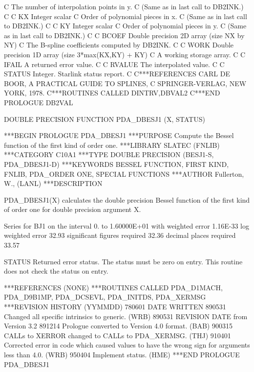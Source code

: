 \documentclass[11pt,twoside,nolof]{starlink}
\begin{document}
\begin{terminalv}
C           The number of interpolation points in y.
C           (Same as in last call to DB2INK.)
C
C   KX      Integer scalar
C           Order of polynomial pieces in x.
C           (Same as in last call to DB2INK.)
C
C   KY      Integer scalar
C           Order of polynomial pieces in y.
C           (Same as in last call to DB2INK.)
C
C   BCOEF   Double precision 2D array (size NX by NY)
C           The B-spline coefficients computed by DB2INK.
C
C   WORK    Double precision 1D array (size 3*max(KX,KY) + KY)
C           A working storage array.
C
C   IFAIL   A returned error value.
C
C   RVALUE  The interpolated value.
C
C   STATUS  Integer. Starlink status report.
C
C***REFERENCES  CARL DE BOOR, A PRACTICAL GUIDE TO SPLINES,
C                 SPRINGER-VERLAG, NEW YORK, 1978.
C***ROUTINES CALLED  DINTRV,DBVAL2
C***END PROLOGUE  DB2VAL
\end{terminalv}



\begin{terminalv}
      DOUBLE PRECISION FUNCTION PDA_DBESJ1 (X, STATUS)


***BEGIN PROLOGUE  PDA_DBESJ1
***PURPOSE  Compute the Bessel function of the first kind of order one.
***LIBRARY   SLATEC (FNLIB)
***CATEGORY  C10A1
***TYPE      DOUBLE PRECISION (BESJ1-S, PDA_DBESJ1-D)
***KEYWORDS  BESSEL FUNCTION, FIRST KIND, FNLIB, PDA_ORDER ONE,
             SPECIAL FUNCTIONS
***AUTHOR  Fullerton, W., (LANL)
***DESCRIPTION

 PDA_DBESJ1(X) calculates the double precision Bessel function of the
 first kind of order one for double precision argument X.

 Series for BJ1        on the interval  0.          to  1.60000E+01
                                        with weighted error   1.16E-33
                                         log weighted error  32.93
                               significant figures required  32.36
                                    decimal places required  33.57

    STATUS   Returned error status.
             The status must be zero on entry. This
             routine does not check the status on entry.

***REFERENCES  (NONE)
***ROUTINES CALLED  PDA_D1MACH, PDA_D9B1MP, PDA_DCSEVL, PDA_INITDS, PDA_XERMSG
***REVISION HISTORY  (YYMMDD)
   780601  DATE WRITTEN
   890531  Changed all specific intrinsics to generic.  (WRB)
   890531  REVISION DATE from Version 3.2
   891214  Prologue converted to Version 4.0 format.  (BAB)
   900315  CALLs to XERROR changed to CALLs to PDA_XERMSG.  (THJ)
   910401  Corrected error in code which caused values to have the
           wrong sign for arguments less than 4.0.  (WRB)
   950404  Implement status.  (HME)
***END PROLOGUE  PDA_DBESJ1
\end{terminalv}
\end{document}

